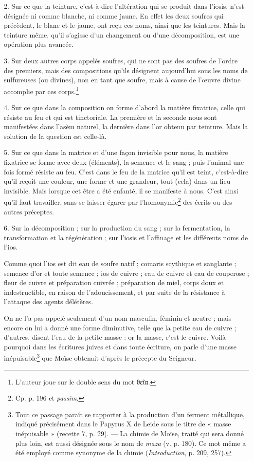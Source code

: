 \documentclass[landscape, a4paper, 11pt, oneside, polutonikogreek, french]{article}
\begin{document}
2. Sur ce que la teinture, c'est-à-dire l'altération qui se produit dans l'iosis, n'est désignée ni comme blanche, ni comme jaune. En effet les deux soufres qui précèdent, le blanc et le jaune, ont reçu ces noms, ainsi que les teintures. Mais la teinture même, qu'il s'agisse d'un changement ou d'une décomposition, est une opération plus avancée.

3. Sur deux autres corps appelés soufres, qui ne sont pas des soufres de l'ordre des premiers, mais des compositions qu'ils désignent aujourd'hui sous les noms de sulfureuses (ou divines), non en tant que soufre, mais à cause de l'œuvre divine accomplie par ces corps.\footnote{L'auteur joue sur le double sens du mot θεῖα.}

4. Sur ce que dans la composition on forme d'abord la matière fixatrice, celle qui résiste au feu et qui est tinctoriale. La première et la seconde nous sont manifestées dans l'asèm naturel, la dernière dans l'or obtenu par teinture. Mais la solution de la question est celle-là.

5. Sur ce que dans la matrice et d'une façon invisible pour nous, la matière fixatrice se forme avec deux (éléments), la semence et le sang ; puis l'animal une fois formé résiste au feu. C'est dans le feu de la matrice qu'il est teint, c'est-à-dire qu'il reçoit une couleur, une forme et une grandeur, tout (cela) dans un lieu invisible. Mais lorsque cet être a été enfanté, il se manifeste à nous. C'est ainsi qu'il faut travailler, sans se laisser égarer par l'homonymie\footnote{Cp. p. 196 et \emph{passim}.} des écrits ou des autres préceptes.

6. Sur la décomposition ; sur la production du sang ; sur la fermentation, la transformation et la régénération ; sur l'iosis et l'affinage et les différents noms de l'ios.

Comme quoi l'ios est dit eau de soufre natif ; comaris scythique et sanglante ; semence d'or et toute semence ; ios de cuivre ; eau de cuivre et eau de couperose ; fleur de cuivre et préparation cuivrée ; préparation de miel, corps doux et indestructible, en raison de l'adoucissement, et par suite de la résistance à l'attaque des agents délétères.

On ne l'a pas appelé seulement d'un nom masculin, féminin et neutre ; mais encore on lui a donné une forme diminutive, telle que la petite eau de cuivre ; d'autres, disent l'eau de la petite masse : or la masse, c'est le cuivre. Voilà pourquoi dans les écritures juives et dans toute écriture, on parle d'une masse inépuisable\footnote{Tout ce passage paraît se rapporter à la production d'un ferment métallique, indiqué précisément dans le Papyrus X de Leide sous le titre de « masse inépuisable » (recette 7, p. 29). --- La chimie de Moïse, traité qui sera donné plus loin, est aussi désignée sous le nom de \emph{maza} (v. p. 180). Ce mot même a été employé comme synonyme de la chimie (\emph{Introduction}, p. 209, 257).} que Moïse obtenait d'après le précepte du Seigneur.
\end{document}
